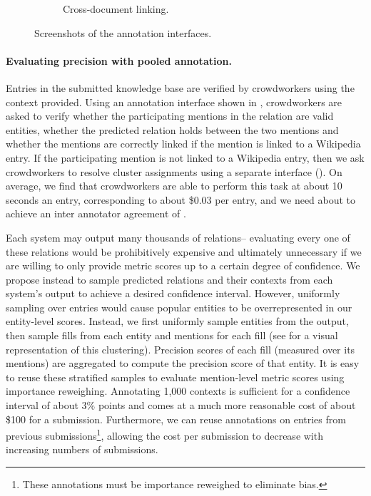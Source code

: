 \begin{figure}
\begin{subfigure}{0.31\textwidth}
  \caption{\label{fig:linking-interface} Cross-document linking.}
\end{subfigure}
\caption{\label{fig:interfaces} Screenshots of the annotation interfaces.}
\end{figure}



\paragraph{Evaluating precision with pooled annotation.}
Entries in the submitted knowledge base are verified by crowdworkers using the context provided.   
Using an annotation interface shown in ,
crowdworkers are asked to verify 
  whether the participating mentions in the relation are valid entities,
  whether the predicted relation holds between the two mentions and
  whether the mentions are correctly linked if the mention is linked to a Wikipedia entry.
If the participating mention is not linked to a Wikipedia entry,
then we ask crowdworkers to resolve cluster assignments using a separate interface ().
On average, we find that crowdworkers are able to perform this task at about 10 seconds an entry, corresponding to about \$0.03 per entry, and we need about  to achieve an inter annotator agreement of .

Each system may output many thousands of relations-- evaluating every one of these relations would be prohibitively expensive
  and ultimately unnecessary if we are willing to only provide metric scores up to a certain degree of confidence.
We propose instead to sample predicted relations and their contexts from each system's output to achieve a desired confidence interval.
However, uniformly sampling over entries would cause popular entities to be overrepresented in our entity-level scores.
Instead, we first uniformly sample entities from the output, then sample fills from each entity and mentions for each fill (see  for a visual representation of this clustering).
Precision scores of each fill (measured over its mentions) are aggregated to compute the precision score of that entity.
It is easy to reuse these stratified samples to evaluate mention-level metric scores using importance reweighing. 
Annotating 1,000 contexts is sufficient for a confidence interval of about 3\% points and comes at a much more reasonable cost of about \$100 for a submission. 
Furthermore, we can reuse annotations on entries from previous submissions\footnote{
These annotations must be importance reweighed to eliminate bias.},
  allowing the cost per submission to decrease with increasing numbers of submissions.

